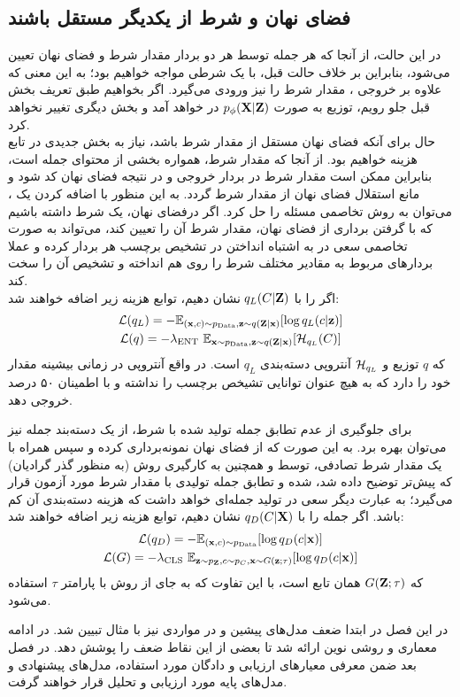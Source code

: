 \subsection{فضای نهان و شرط از یکدیگر مستقل باشند}
در این حالت، از آنجا که هر جمله توسط هر دو بردار مقدار شرط و فضای نهان تعیین می‌شود، بنابراین بر خلاف حالت قبل، با یک \decoder{} شرطی مواجه خواهیم بود؛ به این معنی که علاوه بر خروجی \encoder{}، مقدار شرط را نیز ورودی می‌گیرد. اگر بخواهیم طبق تعریف بخش قبل جلو رویم، توزیع \decoder{} به صورت  $p_\phi({\bf X}|{\bf Z})$ در خواهد آمد و بخش دیگری تغییر نخواهد کرد.
\\
حال برای آنکه فضای نهان مستقل از مقدار شرط باشد، نیاز به بخش جدیدی در تابع هزینه خواهیم بود. از آنجا که مقدار شرط، همواره بخشی از محتوای جمله است، بنابراین ممکن است مقدار شرط در بردار خروجی \encoder{} و در نتیجه فضای نهان کد شود و مانع استقلال فضای نهان از مقدار شرط گردد. به این منظور با اضافه کردن یک \classifier{}، می‌توان به روش تخاصمی مسئله را حل کرد. اگر درفضای نهان، یک \classifier{} شرط داشته باشیم که با گرفتن برداری از فضای نهان، مقدار شرط آن را تعیین کند، \encoder{} می‌تواند به صورت تخاصمی سعی در به اشتباه انداختن \classifier{} در تشخیص برچسب هر بردار کرده و عملا بردار‌های مربوط به مقادیر مختلف شرط را روی هم انداخته و تشخیص آن را سخت کند.
\\
اگر \classifier{} را با $q_L(C|{\bf Z})$ نشان دهیم، توابع هزینه زیر اضافه خواهند شد:
\begin{gather}
    {\mathcal{L}}(q_L) = -\mathbb E_{({\bf x},c) \sim p_\text{Data}, {\bf z} \sim q({\bf Z}|{\bf x})} [\log q_L(c|{\bf z})]
    \\
    {\mathcal{L}}(q) = -\lambda_\text{ENT} ~\mathbb E_{{\bf x} \sim p_\text{Data}, {\bf z} \sim q({\bf Z}|{\bf x})} [{\mathcal{H}}_{q_L}(C)]
\end{gather}
که $q$ توزیع \encoder{} و  ${\mathcal{H}}_{q_L}$ آنتروپی دسته‌بندی \classifier{} 
$q_L$ 
است. در واقع آنتروپی در زمانی بیشینه مقدار خود را دارد که \classifier{} به هیچ عنوان توانایی تشیخص برچسب را نداشته و با اطمینان ۵۰ درصد خروجی دهد.

برای جلوگیری از عدم تطابق جمله تولید شده با شرط، از یک دسته‌بند جمله نیز می‌توان بهره برد. به این صورت که از فضای نهان نمونه‌برداری کرده و سپس همراه با یک مقدار شرط تصادفی، توسط \decoder{} و همچنین به کارگیری روش  (به منظور گذر گرادیان) که پیش‌تر توضیح داده شد،
 \decode{} 
 شده و تطابق جمله تولیدی با مقدار شرط مورد آزمون قرار می‌گیرد؛ به عبارت دیگر \decoder{} سعی در تولید جمله‌ای خواهد داشت که هزینه دسته‌بندی آن کم باشد.
 اگر \classifier{} جمله را با $q_D(C|{\bf X})$ نشان دهیم، توابع هزینه زیر اضافه خواهند شد:
 \begin{gather}
 {\mathcal{L}}(q_D) = -\mathbb E_{({\bf x},c) \sim p_\text{Data}} [\log q_D(c|{\bf x})]
 \\
 {\mathcal{L}}(G) = -\lambda_\text{CLS} ~\mathbb E_{{\bf z} \sim p_{\bf Z}, c \sim p_C, {\bf x} \sim G({\bf z};\tau)} [\log q_D(c|{\bf x})]
 \end{gather}
که $G({\bf Z}; \tau)$ همان تابع \decoder{} است، با این تفاوت که به جای \greedydecoding{} از روش  با پارامتر $\tau{}$ استفاده می‌شود.

در این فصل در ابتدا ضعف مدل‌های پیشین و در مواردی نیز با مثال تبیین شد. در ادامه معماری و روشی نوین ارائه شد تا بعضی از این نقاط ضعف را پوشش دهد. در فصل بعد ضمن معرفی معیارهای ارزیابی و دادگان مورد استفاده، مدل‌های پیشنهادی و مدل‌های پایه مورد ارزیابی و تحلیل قرار خواهند گرفت.

